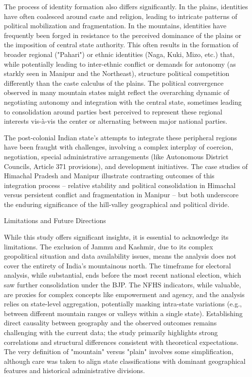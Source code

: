 \begin{sloppypar}
The process of identity formation also differs significantly. In the plains, identities have often coalesced around caste and religion, leading to intricate patterns of political mobilization and fragmentation. In the mountains, identities have frequently been forged in resistance to the perceived dominance of the plains or the imposition of central state authority. This often results in the formation of broader regional ("Pahari") or ethnic identities (Naga, Kuki, Mizo, etc.) that, while potentially leading to inter-ethnic conflict or demands for autonomy (as starkly seen in Manipur and the Northeast), structure political competition differently than the caste calculus of the plains. The political convergence observed in many mountain states might reflect the overarching dynamic of negotiating autonomy and integration with the central state, sometimes leading to consolidation around parties best perceived to represent these regional interests vis-à-vis the center or alternating between major national parties.

The post-colonial Indian state's attempts to integrate these peripheral regions have been fraught with challenges, involving a complex interplay of coercion, negotiation, special administrative arrangements (like Autonomous District Councils, Article 371 provisions), and development initiatives. The case studies of Himachal Pradesh and Manipur illustrate contrasting outcomes of this integration process – relative stability and political consolidation in Himachal versus persistent conflict and fragmentation in Manipur – but both underscore the enduring significance of the hill-valley geographical and political divide.

Limitations and Future Directions

While this study offers significant insights, it is essential to acknowledge its limitations. The exclusion of Jammu and Kashmir, due to its complex geopolitical situation and data availability issues, means the analysis does not cover the entirety of India's mountainous north. The timeframe for electoral analysis, while substantial, ends before the most recent national election, which saw further consolidation under the BJP. The NFHS indicators, while valuable, are proxies for complex concepts like empowerment and agency, and the analysis relies on state-level aggregation, potentially masking intra-state variations (e.g., between different mountain ranges or valleys within a single state). Establishing direct causality between geography and the observed outcomes remains challenging with the current data; the study primarily highlights strong correlations and structural differences consistent with theoretical expectations. The very definition of "mountain" versus "plain" involves some simplification, although care was taken to align state classifications with dominant geographical features and historical administrative divisions.


\end{sloppypar}
